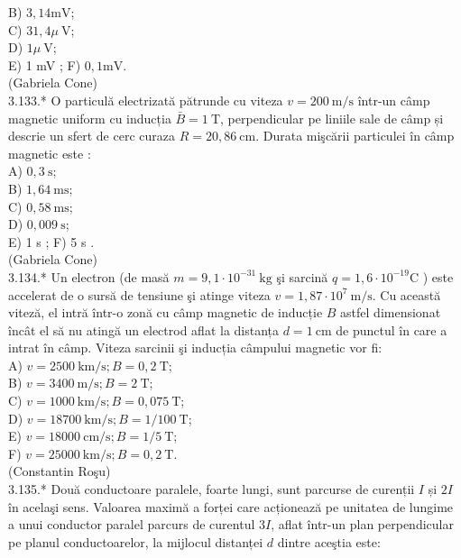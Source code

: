 \documentclass[10pt]{article}
\begin{document}
B) $3,14 \mathrm{mV}$;\\
C) $31,4 \mu \mathrm{~V}$;\\
D) $1 \mu \mathrm{~V}$;\\
E) 1 mV ; F) $0,1 \mathrm{mV}$.\\
(Gabriela Cone)\\
3.133.* O particulă electrizată pătrunde cu viteza $v=200 \mathrm{~m} / \mathrm{s}$ într-un câmp magnetic uniform cu inducția $\bar{B}=1 \mathrm{~T}$, perpendicular pe liniile sale de câmp și\\
descrie un sfert de cerc curaza $R=20,86 \mathrm{~cm}$. Durata mişcării particulei în câmp magnetic este :\\
A) $0,3 \mathrm{~s}$;\\
B) $1,64 \mathrm{~ms}$;\\
C) $0,58 \mathrm{~ms}$;\\
D) $0,009 \mathrm{~s}$;\\
E) 1 s ; F) 5 s .\\
(Gabriela Cone)\\
3.134.* Un electron (de masă $m=9,1 \cdot 10^{-31} \mathrm{~kg}$ şi sarcină $q=1,6 \cdot 10^{-19} \mathrm{C}$ ) este accelerat de o sursă de tensiune şi atinge viteza $v=1,87 \cdot 10^{7} \mathrm{~m} / \mathrm{s}$. Cu această viteză, el intră într-o zonă cu câmp magnetic de inducție $B$ astfel dimensionat încât el să nu atingă un electrod aflat la distanța $d=1 \mathrm{~cm}$ de punctul în care a intrat în câmp. Viteza sarcinii şi inducția câmpului magnetic vor fi:\\
A) $v=2500 \mathrm{~km} / \mathrm{s} ; B=0,2 \mathrm{~T}$;\\
B) $v=3400 \mathrm{~m} / \mathrm{s} ; B=2 \mathrm{~T}$;\\
C) $v=1000 \mathrm{~km} / \mathrm{s} ; B=0,075 \mathrm{~T}$;\\
D) $v=18700 \mathrm{~km} / \mathrm{s} ; B=1 / 100 \mathrm{~T}$;\\
E) $v=18000 \mathrm{~cm} / \mathrm{s} ; B=1 / 5 \mathrm{~T}$;\\
F) $v=25000 \mathrm{~km} / \mathrm{s} ; B=0,2 \mathrm{~T}$.\\
(Constantin Roşu)\\
3.135.* Două conductoare paralele, foarte lungi, sunt parcurse de curenții $I$ și $2 I$ în acelaşi sens. Valoarea maximă a forței care acționează pe unitatea de lungime a unui conductor paralel parcurs de curentul $3 I$, aflat într-un plan perpendicular pe planul conductoarelor, la mijlocul distanței $d$ dintre aceştia este:\\
\end{document}
